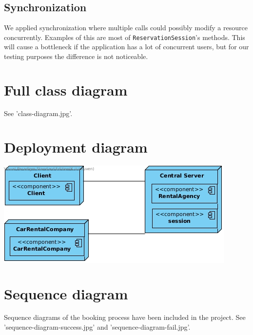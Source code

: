 \documentclass{scrartcl}
\begin{document}
    \subsection{Synchronization}
	We applied synchronization where multiple calls could possibly modify a resource
	concurrently. Examples of this are most of \texttt{ReservationSession}'s methods. 
	This will cause a bottleneck if the application has a lot of concurrent users, but for our testing purposes the difference is not noticeable.
	
	\section{Full class diagram}
    See 'class-diagram.jpg'.

	\section{Deployment diagram}
    \includegraphics{deployment-diagram.jpg}

    \section{Sequence diagram}
    Sequence diagrams of the booking process have been included in the project.
    See 'sequence-diagram-success.jpg' and 'sequence-diagram-fail.jpg'.

\end{document}
